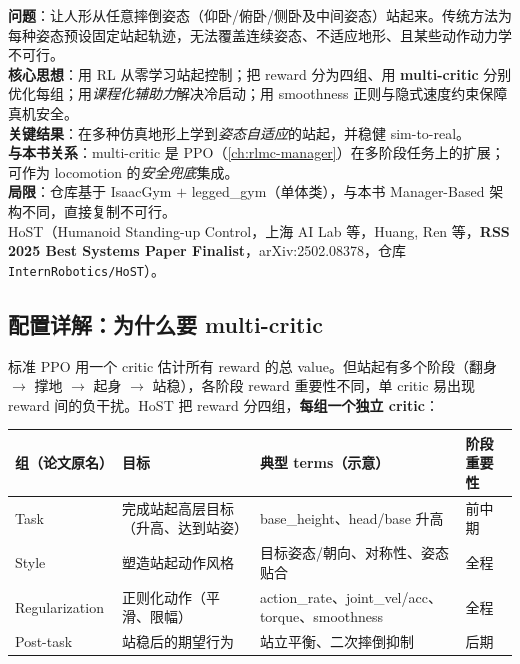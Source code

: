 \begin{paper}\label{paper:rlmc-hl-host}
\textbf{问题}：让人形从任意摔倒姿态（仰卧/俯卧/侧卧及中间姿态）站起来。传统方法为每种姿态预设固定站起轨迹，无法覆盖连续姿态、不适应地形、且某些动作动力学不可行。\\
\textbf{核心思想}：用 RL 从零学习站起控制；把 reward 分为四组、用 \textbf{multi-critic} 分别优化每组；用\emph{课程化辅助力}解决冷启动；用 smoothness 正则与隐式速度约束保障真机安全。\\
\textbf{关键结果}：在多种仿真地形上学到\emph{姿态自适应}的站起，并稳健 sim-to-real。\\
\textbf{与本书关系}：multi-critic 是 PPO（\cref{ch:rlmc-manager}）在多阶段任务上的扩展；可作为 locomotion 的\emph{安全兜底}集成。\\
\textbf{局限}：仓库基于 IsaacGym $+$ legged\_gym（单体类），与本书 Manager-Based 架构不同，直接复制不可行。\\
HoST（Humanoid Standing-up Control，上海 AI Lab 等，Huang, Ren 等，\textbf{RSS 2025 Best Systems Paper Finalist}，arXiv:2502.08378，仓库 \texttt{InternRobotics/HoST}）\cite{huang2025host}。
\end{paper}

\subsection{配置详解：为什么要 multi-critic}
标准 PPO 用一个 critic 估计所有 reward 的总 value。但站起有多个阶段（翻身 $\to$ 撑地 $\to$ 起身 $\to$ 站稳），各阶段 reward 重要性不同，单 critic 易出现 reward 间的负干扰。HoST 把 reward 分四组，\textbf{每组一个独立 critic}：

\begin{center}
\small
\begin{tabular}{p{2.0cm}p{3.2cm}p{4.6cm}p{1.6cm}}
\hline
组（论文原名） & 目标 & 典型 terms（示意） & 阶段重要性 \\
\hline
Task & 完成站起高层目标（升高、达到站姿） & base\_height、head/base 升高 & 前中期 \\
Style & 塑造站起动作风格 & 目标姿态/朝向、对称性、姿态贴合 & 全程 \\
Regularization & 正则化动作（平滑、限幅） & action\_rate、joint\_vel/acc、torque、smoothness & 全程 \\
Post-task & 站稳后的期望行为 & 站立平衡、二次摔倒抑制 & 后期 \\
\hline
\end{tabular}
\end{center}

